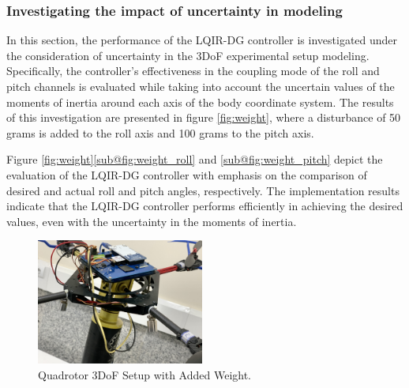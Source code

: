 \documentclass[3p,times]{elsarticle}
\begin{document}
\subsubsection{Investigating the impact of uncertainty in modeling}\label{sec:model-uncertainty}
\noindent In this section, the performance of the LQIR-DG controller is investigated under the consideration of uncertainty in the 3DoF experimental setup modeling. Specifically, the controller's effectiveness in the coupling mode of the roll and pitch channels is evaluated while taking into account the uncertain values of the moments of inertia around each axis of the body coordinate system. The results of this investigation are presented in figure \ref{fig:weight}, where a disturbance of 50 grams is added to the roll axis and 100 grams to the pitch axis.

Figure \ref{fig:weight}\ref{sub@fig:weight_roll} and \ref{sub@fig:weight_pitch} depict the evaluation of the LQIR-DG controller with emphasis on the comparison of desired and actual roll and pitch angles, respectively. The implementation results indicate that the LQIR-DG controller performs efficiently in achieving the desired values, even with the uncertainty in the moments of inertia.
\begin{figure}[H]
	\centering
	\includegraphics[width=0.49\textwidth]{../Figure/implementation/weight/Quad_with_weight.jpg}
	\caption{Quadrotor 3DoF Setup with Added Weight.}
	\label{fig:quadrotor_with_weight}
 \end{figure}
\end{document}
